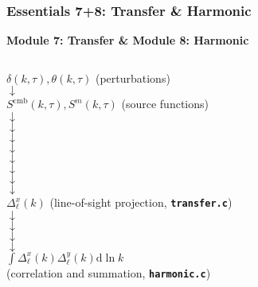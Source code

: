 
	


	




\begin{frame}[fragile]
	\frametitle{Essentials 7+8: Transfer \& Harmonic}
	
	{\bf Module 7: Transfer \& Module 8: Harmonic}
	\begin{columns}[T] %
	\begin{column}{0.56\textwidth}
		\begin{center}
			$\delta(k,\tau), \theta(k,\tau)$ (perturbations)\\
			$\downarrow$ \\
			$S^\mathrm{cmb}(k,\tau), S^{m}(k,\tau)$ (source functions)\\
			$\downarrow$ \\
			$\downarrow$ \\
			$\downarrow$ \\
			$\downarrow$ \\
			$\downarrow$ \\
			$\downarrow$ \\
			$\downarrow$ \\
			$\downarrow$ \\
			$\Delta^x_\ell(k)$ (line-of-sight projection, {\bf \tt transfer.c})\\
			$\downarrow$ \\
			$\downarrow$ \\
			$\downarrow$ \\
			$\downarrow$ \\
			$\int \Delta^x_\ell(k) \Delta^y_\ell(k) \mathrm{d}\ln k$ \\ (correlation and summation, {\bf \tt harmonic.c})
		\end{center}
	\end{column}
	\begin{column}{0.4\textwidth}
	\end{column}
	\end{columns}
\end{frame}

